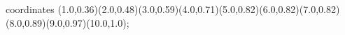 					coordinates { (1.0,0.36)(2.0,0.48)(3.0,0.59)(4.0,0.71)(5.0,0.82)(6.0,0.82)(7.0,0.82)(8.0,0.89)(9.0,0.97)(10.0,1.0)};